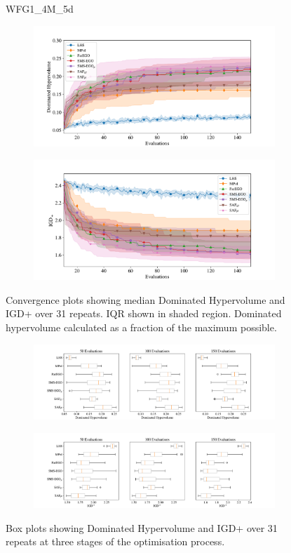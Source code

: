 \documentclass[conference]{IEEEtran}
\begin{document}
\begin{figure}
WFG1\_4M\_5d


\begin{subfigure}[hbt!]{\linewidth}

    \centering
    \includegraphics[width=0.7\linewidth]{figures/wfg1_4obj_5dim_hv_plot.pdf}
\end{subfigure}
\begin{subfigure}[h]{\linewidth}
    \centering
    \includegraphics[width=0.7\linewidth]{figures/wfg1_4obj_5dim_igd_plot.pdf}
\end{subfigure}
    \caption{Convergence plots showing median Dominated Hypervolume and IGD+ over 31 repeats. IQR shown in shaded region. Dominated hypervolume calculated as a fraction of the maximum possible.}
\vspace{\floatsep}
\begin{subfigure}[t]{\linewidth}
    \centering
    \includegraphics[width=0.8\linewidth]{figures/wfg1_4obj_5dim_hv_boxplot.pdf}
\end{subfigure}
\begin{subfigure}[t]{\linewidth}
    \centering
    \includegraphics[width=0.8\linewidth]{figures/wfg1_4obj_5dim_igd_boxplot.pdf}
\end{subfigure}
    \caption{Box plots showing Dominated Hypervolume and IGD+ over 31 repeats at three stages of the optimisation process.}
\end{figure}
\clearpage
\end{document}
